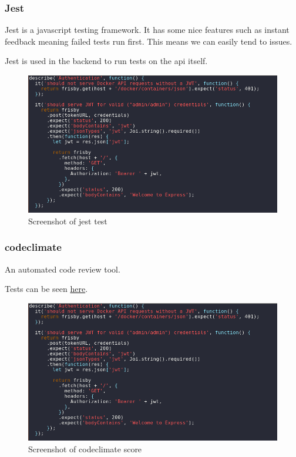 \documentclass[]{article}
\begin{document}
\subsubsection{Jest}
Jest is a javascript testing framework.
It has some nice features such as instant feedback meaning
failed tests run first. This means we can easily tend to issues.

Jest is used in the backend to run tests on the api itself.
\begin{figure}[H]
	\centering
	\includegraphics[scale=0.5]{jest.png}
	\caption{Screenshot of jest test}
\end{figure}

\subsubsection{codeclimate}
An automated code review tool.

Tests can be seen \href{https://codeclimate.com/github/TripleParity/docks-ui}{here}.
\begin{figure}[H]
	\centering
	\includegraphics[scale=0.5]{jest.png}
	\caption{Screenshot of codeclimate score}
\end{figure}
\end{document}
